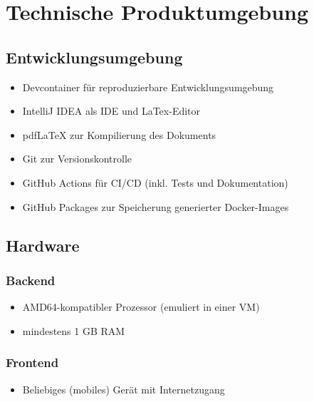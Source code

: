 

\chapter{Technische Produktumgebung}
\label{chap:tech_env}

\section{Entwicklungsumgebung}

\begin{itemize}
    \item Devcontainer für reproduzierbare Entwicklungsumgebung
    \item IntelliJ IDEA als IDE und LaTex-Editor
    \item pdfLaTeX zur Kompilierung des Dokuments
    \item Git zur Versionskontrolle
    \item GitHub Actions für CI/CD (inkl. Tests und Dokumentation)
    \item GitHub Packages zur Speicherung generierter Docker-Images
\end{itemize}

\section{Hardware}

\subsection{Backend}

\begin{itemize}
    \item AMD64-kompatibler Prozessor (emuliert in einer VM)
    \item mindestens 1 GB RAM
\end{itemize}

\subsection{Frontend}

\begin{itemize}
    \item Beliebiges (mobiles) Gerät mit Internetzugang
\end{itemize}

